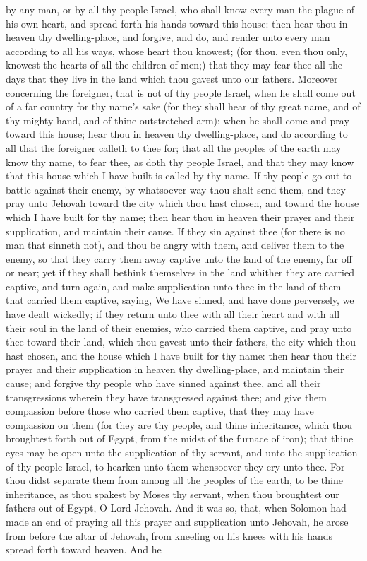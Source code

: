 by any man, or by all thy people Israel, who shall know every man the plague of his own heart, and spread forth his hands toward this house: then hear thou in heaven thy dwelling-place, and forgive, and do, and render unto every man according to all his ways, whose heart thou knowest; (for thou, even thou only, knowest the hearts of all the children of men;) that they may fear thee all the days that they live in the land which thou gavest unto our fathers.  Moreover concerning the foreigner, that is not of thy people Israel, when he shall come out of a far country for thy name’s sake (for they shall hear of thy great name, and of thy mighty hand, and of thine outstretched arm); when he shall come and pray toward this house; hear thou in heaven thy dwelling-place, and do according to all that the foreigner calleth to thee for; that all the peoples of the earth may know thy name, to fear thee, as doth thy people Israel, and that they may know that this house which I have built is called by thy name.  If thy people go out to battle against their enemy, by whatsoever way thou shalt send them, and they pray unto Jehovah toward the city which thou hast chosen, and toward the house which I have built for thy name; then hear thou in heaven their prayer and their supplication, and maintain their cause.  If they sin against thee (for there is no man that sinneth not), and thou be angry with them, and deliver them to the enemy, so that they carry them away captive unto the land of the enemy, far off or near; yet if they shall bethink themselves in the land whither they are carried captive, and turn again, and make supplication unto thee in the land of them that carried them captive, saying, We have sinned, and have done perversely, we have dealt wickedly; if they return unto thee with all their heart and with all their soul in the land of their enemies, who carried them captive, and pray unto thee toward their land, which thou gavest unto their fathers, the city which thou hast chosen, and the house which I have built for thy name: then hear thou their prayer and their supplication in heaven thy dwelling-place, and maintain their cause; and forgive thy people who have sinned against thee, and all their transgressions wherein they have transgressed against thee; and give them compassion before those who carried them captive, that they may have compassion on them (for they are thy people, and thine inheritance, which thou broughtest forth out of Egypt, from the midst of the furnace of iron); that thine eyes may be open unto the supplication of thy servant, and unto the supplication of thy people Israel, to hearken unto them whensoever they cry unto thee. For thou didst separate them from among all the peoples of the earth, to be thine inheritance, as thou spakest by Moses thy servant, when thou broughtest our fathers out of Egypt, O Lord Jehovah.  And it was so, that, when Solomon had made an end of praying all this prayer and supplication unto Jehovah, he arose from before the altar of Jehovah, from kneeling on his knees with his hands spread forth toward heaven. And he 